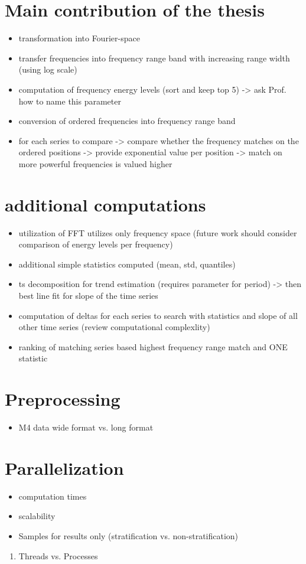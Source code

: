 \documentclass[phd,black, hidelinks]{PrincetonThesis}
\begin{document}
\section{Main contribution of the thesis}
\label{sec:orga9ed9eb}
\begin{itemize}
\item transformation into Fourier-space
\item transfer frequencies into frequency range band with increasing range width (using log scale)
\item computation of frequency energy levels (sort and keep top 5) -> ask Prof. how to name this parameter
\item conversion of ordered frequencies into frequency range band
\item for each series to compare -> compare whether the frequency matches on the ordered positions -> provide exponential value per position -> match on more powerful frequencies is valued higher
\end{itemize}
\section{additional computations}
\label{sec:org027ed4d}
\begin{itemize}
\item utilization of FFT utilizes only frequency space (future work should consider comparison of energy levels per frequency)
\item additional simple statistics computed (mean, std, quantiles)
\item ts decomposition for trend estimation (requires parameter for period) -> then best line fit for slope of the time series
\item computation of deltas for each series to search with statistics and slope of all other time series (review computational complexlity)
\item ranking of matching series based highest frequency range match and ONE statistic
\end{itemize}
\section{Preprocessing}
\label{sec:org3374f0f}
\begin{itemize}
\item M4 data wide format vs. long format
\end{itemize}
\section{Parallelization}
\label{sec:org2a864fc}
\begin{itemize}
\item computation times
\item scalability
\item Samples for results only (stratification vs. non-stratification)
\end{itemize}
\begin{enumerate}
\item Threads vs. Processes
\label{sec:org63c8c19}
\end{enumerate}
\end{document}
